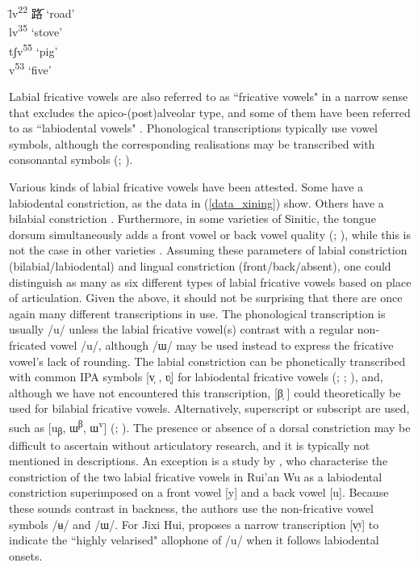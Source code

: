 \documentclass[output=paper,colorlinks,citecolor=brown,chinesefont]{langscibook}
\begin{document}
\ea \label{data_xining}
    \begin{tabbing}
        \quad \= lv\textsuperscript{22} \quad \={\cn 路} `road'\\
        \>lv\textsuperscript{35}  `stove' \\
        \> tʃv\textsuperscript{55}  `pig' \\
       \> v\textsuperscript{53}  `five'
    \end{tabbing}
\z

Labial fricative vowels are also referred to as ``fricative vowels" in a narrow sense that excludes the apico-(post)alveolar type, and some of them have been referred to as ``labiodental vowels" \citep{Hu&He_2019}. Phonological transcriptions typically use vowel symbols, although the corresponding realisations may be transcribed with consonantal symbols (\cite{Hu&He_2019}; \cite{Yuan&al_2019}). 

Various kinds of labial fricative vowels have been attested. Some have a labiodental constriction, as the data in (\ref{data_xining}) show. Others have a bilabial constriction \citep{Faytak_et_al_2019}. Furthermore, in some varieties of Sinitic, the tongue dorsum simultaneously adds a front vowel or back vowel quality (\cite{Hu&He_2019}; \cite[48]{shao_2020}), while this is not the case in other varieties \citep{Faytak_et_al_2019}. Assuming these parameters of labial constriction (bilabial/labiodental) and lingual constriction (front/back/absent), one could distinguish as many as six different types of labial fricative vowels based on place of articulation. Given the above, it should not be surprising that there are once again many different transcriptions in use. The phonological transcription is usually /u/ unless the labial fricative vowel(s) contrast with a regular non-fricated vowel /u/, although /ɯ/ may be used instead to express the fricative vowel's lack of rounding. The labial constriction can be phonetically transcribed with common IPA symbols [v̩ , ʋ̩] for labiodental fricative vowels (\cite{Zhang_and_Xing_2011}; \cite{Scholz_2012}; \cite{Hu&Ling_2019}), and, although we have not encountered this transcription, [β̩ ] could theoretically be used for bilabial fricative vowels. Alternatively, superscript or subscript are used, such as [u\textsubscript{β}, ɯ\textsuperscript{β}, ɯ\textsuperscript{v}] (\cite{Zhu_2004}; \cite{Faytak_et_al_2019}). The presence or absence of a dorsal constriction may be difficult to ascertain without articulatory research, and it is typically not mentioned in descriptions. An exception is a study by \citet{Hu&He_2019}, who characterise the constriction of the two labial fricative vowels in Rui'an Wu as a labiodental constriction superimposed on a front vowel [y] and a back vowel [u]. Because these sounds contrast in backness, the authors use the non-fricative vowel symbols /ʉ/ and /ɯ/. For Jixi Hui, \citet[48]{shao_2020} proposes a narrow transcription [v̩ˠ] to indicate the ``highly velarised" allophone of /u/ when it follows labiodental onsets.
\end{document}
